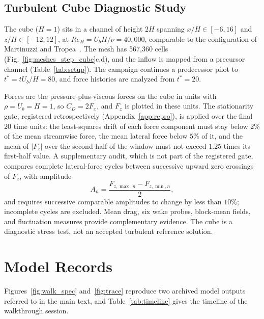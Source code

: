 \documentclass[11pt]{article}
\begin{document}
\subsection{Turbulent Cube Diagnostic Study}
\label{sec:cube_setup}

The cube ($H=1$) sits in a channel of height $2H$ spanning $x/H\in[-6,16]$
and $z/H\in[-12,12]$, at $Re_H=U_bH/\nu=40{,}000$, comparable to the
configuration of Martinuzzi and Tropea~\cite{martinuzzi1993cube}. The mesh has
567,360 cells (Fig.~\ref{fig:meshes_step_cube}c,d), and the inflow is mapped
from a precursor channel (Table~\ref{tab:setup}). The campaign continues a
predecessor pilot to $t^*=tU_b/H=80$, and force histories are analyzed from
$t^*=20$.

Forces are the pressure-plus-viscous forces on the cube in units with
$\rho=U_b=H=1$, so $C_D=2F_x$, and $F_z$ is plotted in these units. The stationarity gate, registered
retrospectively (Appendix~\ref{app:repro}), is applied over the final 20 time
units: the least-squares drift of each force component must stay below $2\%$
of the mean streamwise force, the mean lateral force below $5\%$ of it, and the
mean of $|F_z|$ over the second half of the window must not exceed $1.25$
times its first-half value. A supplementary audit, which is not part of the
registered gate, compares complete lateral-force cycles between successive
upward zero crossings of $F_z$, with amplitude
\begin{equation}
    A_n =
    \frac{F_{z,\max,n}-F_{z,\min,n}}{2},
    \label{eq:cycle_amplitude}
\end{equation}
and requires successive comparable amplitudes to change by less than $10\%$;
incomplete cycles are excluded. Mean drag, six wake probes, block-mean fields,
and fluctuation measures provide complementary evidence.
The cube is a diagnostic stress test, not an accepted turbulent reference
solution.

\section{Model Records}
\label{app:records}

Figures~\ref{fig:walk_spec} and~\ref{fig:trace} reproduce two archived model
outputs referred to in the main text, and Table~\ref{tab:timeline} gives the
timeline of the walkthrough session.
\end{document}
